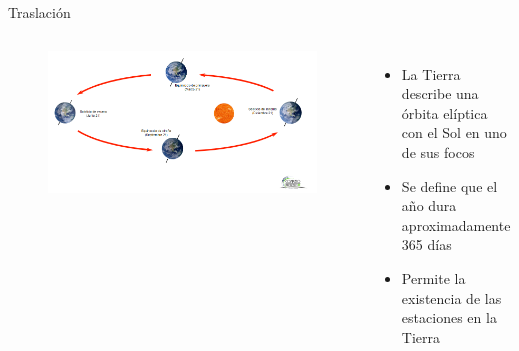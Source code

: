 \documentclass{beamer}
\begin{document}
\begin{frame}{Traslación}
 \begin{columns}
  \begin{figure}
   \centering
   \includegraphics[scale=0.2]{Imagenes/Traslacion_01}
  \end{figure}
 \small
 \justify
\begin{itemize}
\item La Tierra describe una órbita elíptica con el Sol en uno de sus focos
\item Se define que el año dura aproximadamente 365 días
\item Permite la existencia de las estaciones en la Tierra
\end{itemize}
 \end{columns}
\end{frame}
\end{document}
